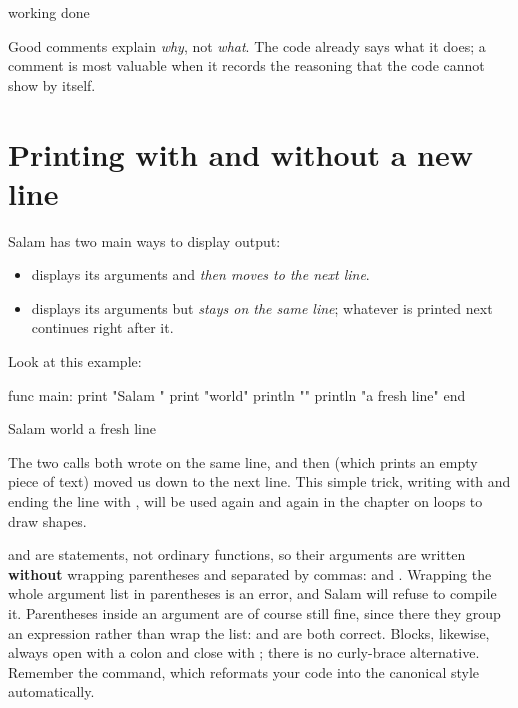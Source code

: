 \begin{progout}
working
done
\end{progout}

\begin{tip}
Good comments explain \emph{why}, not \emph{what}. The code already says what it
does; a comment is most valuable when it records the reasoning that the code
cannot show by itself.
\end{tip}

\section{Printing with and without a new line}

Salam has two main ways to display output:

\begin{itemize}[leftmargin=1.4em]
  \item {} displays its arguments and \emph{then moves to the
        next line}.
  \item {} displays its arguments but \emph{stays on the same
        line}; whatever is printed next continues right after it.
\end{itemize}

Look at this example:

\begin{salamen}
func main:
    print "Salam "
    print "world"
    println ""
    println "a fresh line"
end
\end{salamen}

\begin{progout}
Salam world
a fresh line
\end{progout}

The two  calls both wrote on the same line, and then
 (which prints an empty piece of text) moved us down to the
next line. This simple trick, writing with  and ending the line
with , will be used again and again in the chapter on loops
to draw shapes.

\begin{deep}
 and  are statements, not ordinary functions, so
their arguments are written \textbf{without} wrapping parentheses and
separated by commas:  and .
Wrapping the whole argument list in parentheses is an error, and Salam will
refuse to compile it. Parentheses inside an argument are of course still
fine, since there they group an expression rather than wrap the list:
 and  are both correct.
Blocks, likewise, always open with a colon and close with ; there
is no curly-brace alternative. Remember the  command,
which reformats your code into the canonical style automatically.
\end{deep}

